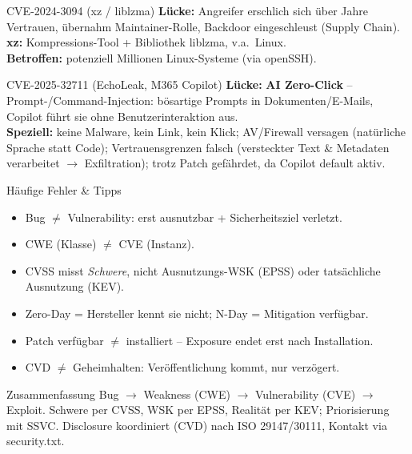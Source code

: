 \documentclass[a4paper, fontsize=7pt]{scrartcl}
\begin{document}
\begin{subbox}{CVE-2024-3094 (xz / liblzma)}
\textbf{Lücke:} Angreifer erschlich sich über Jahre Vertrauen,
übernahm Maintainer-Rolle, Backdoor eingeschleust (Supply Chain).\\
\textbf{xz:} Kompressions-Tool + Bibliothek liblzma, v.a.\ Linux.\\
\textbf{Betroffen:} potenziell Millionen Linux-Systeme (via openSSH).
\end{subbox}

\begin{subbox}{CVE-2025-32711 (EchoLeak, M365 Copilot)}
\textbf{Lücke:} \textbf{AI Zero-Click} -- Prompt-/Command-Injection:
bösartige Prompts in Dokumenten/E-Mails, Copilot führt sie ohne
Benutzerinteraktion aus.\\
\textbf{Speziell:} keine Malware, kein Link, kein Klick; AV/Firewall
versagen (natürliche Sprache statt Code); Vertrauensgrenzen falsch
(versteckter Text \& Metadaten verarbeitet $\to$ Exfiltration); trotz
Patch gefährdet, da Copilot default aktiv.
\end{subbox}

\begin{subbox}{Häufige Fehler \& Tipps}
\begin{itemize}
    \item Bug $\neq$ Vulnerability: erst ausnutzbar + Sicherheitsziel
          verletzt.
    \item CWE (Klasse) $\neq$ CVE (Instanz).
    \item CVSS misst \emph{Schwere}, nicht Ausnutzungs-WSK (EPSS) oder
          tatsächliche Ausnutzung (KEV).
    \item Zero-Day = Hersteller kennt sie nicht; N-Day = Mitigation
          verfügbar.
    \item Patch verfügbar $\neq$ installiert -- Exposure endet erst nach
          Installation.
    \item CVD $\neq$ Geheimhalten: Veröffentlichung kommt, nur verzögert.
\end{itemize}
\end{subbox}

\begin{subbox}{Zusammenfassung}
Bug $\to$ Weakness (CWE) $\to$ Vulnerability (CVE) $\to$ Exploit.
Schwere per CVSS, WSK per EPSS, Realität per KEV; Priorisierung mit SSVC.
Disclosure koordiniert (CVD) nach ISO 29147/30111, Kontakt via
security.txt.
\end{subbox}

\end{document}
